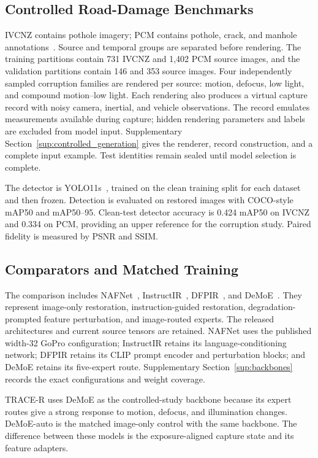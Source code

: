 \documentclass[journal]{IEEEtran}
\begin{document}
\subsection{Controlled Road-Damage Benchmarks}
IVCNZ contains pothole imagery; PCM contains pothole, crack, and manhole annotations~\cite{giordani2025roadpcm}. Source and temporal groups are separated before rendering. The training partitions contain 731 IVCNZ and 1,402 PCM source images, and the validation partitions contain 146 and 353 source images. Four independently sampled corruption families are rendered per source: motion, defocus, low light, and compound motion--low light. Each rendering also produces a virtual capture record with noisy camera, inertial, and vehicle observations. The record emulates measurements available during capture; hidden rendering parameters and labels are excluded from model input. Supplementary Section~\ref{sup:controlled_generation} gives the renderer, record construction, and a complete input example. Test identities remain sealed until model selection is complete.

The detector is YOLO11s~\cite{ultralytics2023yolo}, trained on the clean training split for each dataset and then frozen. Detection is evaluated on restored images with COCO-style mAP50 and mAP50--95. Clean-test detector accuracy is 0.424 mAP50 on IVCNZ and 0.334 on PCM, providing an upper reference for the corruption study. Paired fidelity is measured by PSNR and SSIM.

\subsection{Comparators and Matched Training}
\label{sec:comparators}
The comparison includes NAFNet~\cite{chen2022nafnet}, InstructIR~\cite{conde2024instructir}, DFPIR~\cite{tian2025dfpir}, and DeMoE~\cite{feijoo2025demoe}. They represent image-only restoration, instruction-guided restoration, degradation-prompted feature perturbation, and image-routed experts. The released architectures and current source tensors are retained. NAFNet uses the published width-32 GoPro configuration; InstructIR retains its language-conditioning network; DFPIR retains its CLIP prompt encoder and perturbation blocks; and DeMoE retains its five-expert route. Supplementary Section~\ref{sup:backbones} records the exact configurations and weight coverage.

TRACE-R uses DeMoE as the controlled-study backbone because its expert routes give a strong response to motion, defocus, and illumination changes. DeMoE-auto is the matched image-only control with the same backbone. The difference between these models is the exposure-aligned capture state and its feature adapters.
\end{document}
